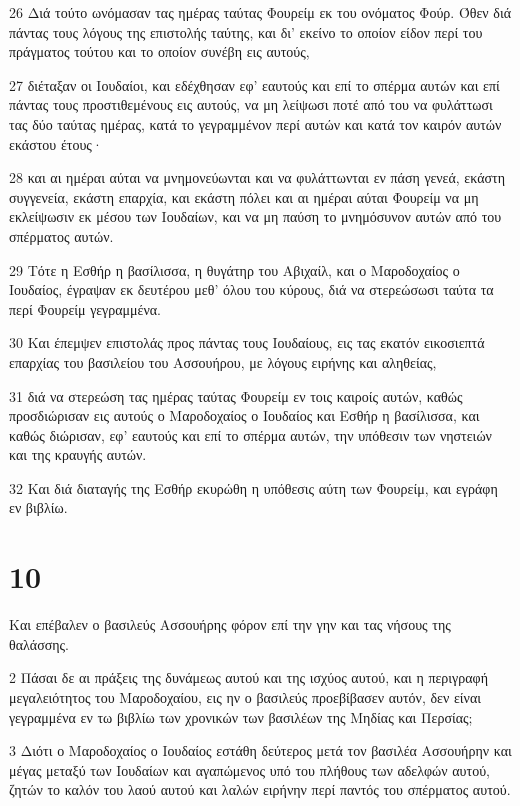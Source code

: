 \par 26 Διά τούτο ωνόμασαν τας ημέρας ταύτας Φουρείμ εκ του ονόματος Φούρ. Όθεν διά πάντας τους λόγους της επιστολής ταύτης, και δι' εκείνο το οποίον είδον περί του πράγματος τούτου και το οποίον συνέβη εις αυτούς,
\par 27 διέταξαν οι Ιουδαίοι, και εδέχθησαν εφ' εαυτούς και επί το σπέρμα αυτών και επί πάντας τους προστιθεμένους εις αυτούς, να μη λείψωσι ποτέ από του να φυλάττωσι τας δύο ταύτας ημέρας, κατά το γεγραμμένον περί αυτών και κατά τον καιρόν αυτών εκάστου έτους·
\par 28 και αι ημέραι αύται να μνημονεύωνται και να φυλάττωνται εν πάση γενεά, εκάστη συγγενεία, εκάστη επαρχία, και εκάστη πόλει και αι ημέραι αύται Φουρείμ να μη εκλείψωσιν εκ μέσου των Ιουδαίων, και να μη παύση το μνημόσυνον αυτών από του σπέρματος αυτών.
\par 29 Τότε η Εσθήρ η βασίλισσα, η θυγάτηρ του Αβιχαίλ, και ο Μαροδοχαίος ο Ιουδαίος, έγραψαν εκ δευτέρου μεθ' όλου του κύρους, διά να στερεώσωσι ταύτα τα περί Φουρείμ γεγραμμένα.
\par 30 Και έπεμψεν επιστολάς προς πάντας τους Ιουδαίους, εις τας εκατόν εικοσιεπτά επαρχίας του βασιλείου του Ασσουήρου, με λόγους ειρήνης και αληθείας,
\par 31 διά να στερεώση τας ημέρας ταύτας Φουρείμ εν τοις καιροίς αυτών, καθώς προσδιώρισαν εις αυτούς ο Μαροδοχαίος ο Ιουδαίος και Εσθήρ η βασίλισσα, και καθώς διώρισαν, εφ' εαυτούς και επί το σπέρμα αυτών, την υπόθεσιν των νηστειών και της κραυγής αυτών.
\par 32 Και διά διαταγής της Εσθήρ εκυρώθη η υπόθεσις αύτη των Φουρείμ, και εγράφη εν βιβλίω.

\chapter{10}

\par Και επέβαλεν ο βασιλεύς Ασσουήρης φόρον επί την γην και τας νήσους της θαλάσσης.
\par 2 Πάσαι δε αι πράξεις της δυνάμεως αυτού και της ισχύος αυτού, και η περιγραφή μεγαλειότητος του Μαροδοχαίου, εις ην ο βασιλεύς προεβίβασεν αυτόν, δεν είναι γεγραμμένα εν τω βιβλίω των χρονικών των βασιλέων της Μηδίας και Περσίας;
\par 3 Διότι ο Μαροδοχαίος ο Ιουδαίος εστάθη δεύτερος μετά τον βασιλέα Ασσουήρην και μέγας μεταξύ των Ιουδαίων και αγαπώμενος υπό του πλήθους των αδελφών αυτού, ζητών το καλόν του λαού αυτού και λαλών ειρήνην περί παντός του σπέρματος αυτού.


